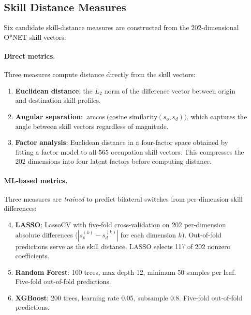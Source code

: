 \documentclass[12pt]{article}
\begin{document}
\subsection{Skill Distance Measures}
\label{sec:strategy_skill}

Six candidate skill-distance measures are constructed from the 202-dimensional O*NET skill vectors:

\paragraph{Direct metrics.} Three measures compute distance directly from the skill vectors:
\begin{enumerate}
    \item \textbf{Euclidean distance}: the $L_2$ norm of the difference vector between origin and destination skill profiles.
    \item \textbf{Angular separation}: $\arccos\!\bigl(\text{cosine similarity}(s_o, s_d)\bigr)$, which captures the angle between skill vectors regardless of magnitude.
    \item \textbf{Factor analysis}: Euclidean distance in a four-factor space obtained by fitting a factor model to all 565 occupation skill vectors. This compresses the 202 dimensions into four latent factors before computing distance.
\end{enumerate}

\paragraph{ML-based metrics.} Three measures are \emph{trained} to predict bilateral switches from per-dimension skill differences:
\begin{enumerate}
    \setcounter{enumi}{3}
    \item \textbf{LASSO}: LassoCV with five-fold cross-validation on 202 per-dimension absolute differences ($|s_o^{(k)} - s_d^{(k)}|$ for each dimension $k$). Out-of-fold predictions serve as the skill distance. LASSO selects 117 of 202 nonzero coefficients.
    \item \textbf{Random Forest}: 100 trees, max depth 12, minimum 50 samples per leaf. Five-fold out-of-fold predictions.
    \item \textbf{XGBoost}: 200 trees, learning rate 0.05, subsample 0.8. Five-fold out-of-fold predictions.
\end{enumerate}
\end{document}
